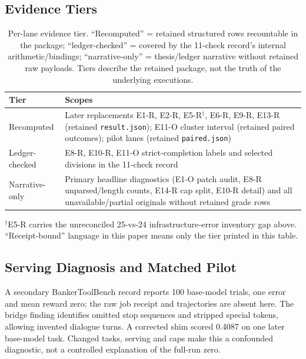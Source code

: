 \documentclass[a4paper,runningheads]{llncs}
\begin{document}
\subsection{Evidence Tiers}
\label{sec:evidence}
\begin{table}[t]
\caption{Per-lane evidence tier. ``Recomputed'' = retained structured rows
recountable in the package; ``ledger-checked'' = covered by the 11-check
record's internal arithmetic/bindings; ``narrative-only'' = thesis/ledger
narrative without retained raw payloads. Tiers describe the retained
package, not the truth of the underlying executions.}
\label{tab:evidence}\centering\small\setlength{\tabcolsep}{3pt}
\begin{tabularx}{\textwidth}{@{}l Y@{}}\toprule
Tier & Scopes \\\midrule
Recomputed & Later replacements E1-R, E2-R, E5-R$^\dagger$, E6-R, E9-R, E13-R (retained \texttt{result.json}); E11-O cluster interval (retained paired outcomes); pilot lanes (retained \texttt{paired.json}) \\
Ledger-checked & E8-R, E10-R, E11-O strict-completion labels and selected divisions in the 11-check record \\
Narrative-only & Primary headline diagnostics (E1-O patch audit, E8-R unparsed/length counts, E14-R cap split, E10-R detail) and all unavailable/partial originals without retained grade rows \\\bottomrule
\end{tabularx}
\par\smallskip\footnotesize\raggedright
$^\dagger$E5-R carries the unreconciled 25-vs-24 infrastructure-error
inventory gap above. ``Receipt-bound'' language in this paper means only
the tier printed in this table.
\end{table}
\subsection{Serving Diagnosis and Matched Pilot}
\label{sec:paired}
A secondary BankerToolBench record reports 100 base-model trials, one error
and mean reward zero; the raw job receipt and trajectories are absent here.
The bridge finding identifies omitted stop sequences and stripped special
tokens, allowing invented dialogue turns. A corrected shim scored 0.4087 on
one later base-model task. Changed tasks, serving and caps make this a
confounded diagnostic, not a controlled explanation of the full-run zero.
\end{document}
